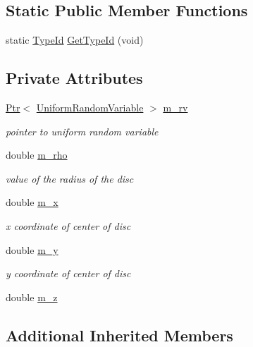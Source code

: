 \subsection*{Static Public Member Functions}
\begin{DoxyCompactItemize}
\item 
static \hyperlink{classns3_1_1TypeId}{Type\+Id} \hyperlink{classns3_1_1UniformDiscPositionAllocator_af06776302888a8a0e8cd09df0105cbbd}{Get\+Type\+Id} (void)
\end{DoxyCompactItemize}
\subsection*{Private Attributes}
\begin{DoxyCompactItemize}
\item 
\hyperlink{classns3_1_1Ptr}{Ptr}$<$ \hyperlink{classns3_1_1UniformRandomVariable}{Uniform\+Random\+Variable} $>$ \hyperlink{classns3_1_1UniformDiscPositionAllocator_ac80294641fed4793385d7ca6a126f2f8}{m\+\_\+rv}
\begin{DoxyCompactList}\small\item\em pointer to uniform random variable \end{DoxyCompactList}\item 
double \hyperlink{classns3_1_1UniformDiscPositionAllocator_a6fad72ec695817051001a3099ef3a2e4}{m\+\_\+rho}
\begin{DoxyCompactList}\small\item\em value of the radius of the disc \end{DoxyCompactList}\item 
double \hyperlink{classns3_1_1UniformDiscPositionAllocator_a75d18640eddf7d54a13e8aba70af7c05}{m\+\_\+x}
\begin{DoxyCompactList}\small\item\em x coordinate of center of disc \end{DoxyCompactList}\item 
double \hyperlink{classns3_1_1UniformDiscPositionAllocator_aa40b9a3c579a9993ca67f20a82a8d1f5}{m\+\_\+y}
\begin{DoxyCompactList}\small\item\em y coordinate of center of disc \end{DoxyCompactList}\item 
double \hyperlink{classns3_1_1UniformDiscPositionAllocator_aeaac1a59c1eb5af1433099616a97fc64}{m\+\_\+z}
\end{DoxyCompactItemize}
\subsection*{Additional Inherited Members}



